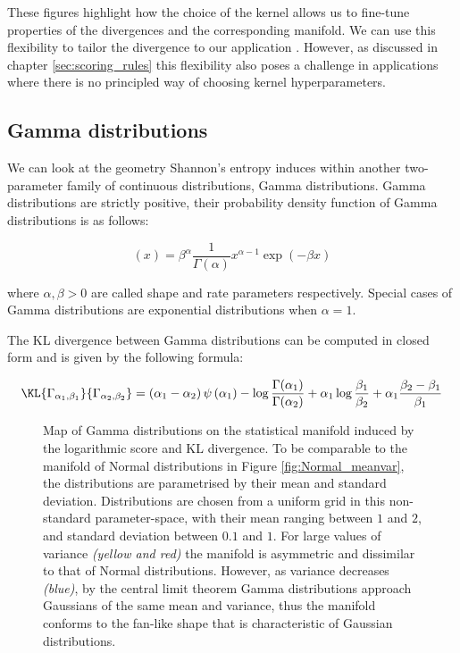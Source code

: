 These figures highlight how the choice of the kernel allows us to fine-tune properties of the divergences and the corresponding manifold. We can use this flexibility to tailor the divergence to our application \citep{Song2008}. However, as discussed in chapter \ref{sec:scoring_rules} this flexibility also poses a challenge in applications where there is no principled way of choosing kernel hyperparameters.

\subsection{Gamma distributions}

We can look at the geometry Shannon's entropy induces within another two-parameter family of continuous distributions, Gamma distributions. Gamma distributions are strictly positive, their probability density function of Gamma distributions is as follows:

\begin{equation}
(x) = \beta^{\alpha}\frac{1}{\Gamma(\alpha)} x^{\alpha-1} \exp(-\beta x)
\end{equation}

where $\alpha,\beta > 0$ are called shape and rate parameters respectively. Special cases of Gamma distributions are exponential distributions when $\alpha=1$.

The KL divergence between Gamma distributions can be computed in closed form and is given by the following formula:

\begin{equation}
	\KL{\Gamma_{\alpha_1,\beta_1}}{\Gamma_{\alpha_2,\beta_2}} = \left(\alpha_1 - \alpha_2\right)\psi\left(\alpha_1\right) - \log\frac{\Gamma(\alpha_1)}{\Gamma(\alpha_2)} + \alpha_1\log\frac{\beta_1}{\beta_2} + \alpha_1\frac{\beta_2 - \beta_1}{\beta_1} \label{eqn:KL_Gamma}
\end{equation}

\begin{figure}[t] %
	\begin{center}
	\end{center}
	\caption[Map of Gamma distributions using the logarithmic score]{Map of Gamma distributions on the statistical manifold induced by the logarithmic score and KL divergence. To be comparable to the manifold of Normal distributions in Figure \ref{fig:Normal_meanvar}, the distributions are parametrised by their mean and standard deviation. Distributions are chosen from a uniform grid in this non-standard parameter-space, with their mean ranging between $1$ and $2$, and standard deviation between $0.1$ and $1$. For large values of variance \emph{(yellow and red)} the manifold is asymmetric and dissimilar to that of Normal distributions. However, as variance decreases \emph{(blue)}, by the central limit theorem Gamma distributions approach Gaussians of the same mean and variance, thus the manifold conforms to the fan-like shape that is characteristic of Gaussian distributions.\label{fig:Gamma_meanvar}}
\end{figure}

